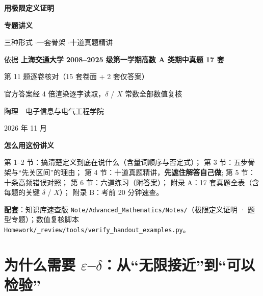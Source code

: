 \documentclass[11pt,a4paper]{ctexart}
\newcommand{\eps}{\varepsilon}
\newcounter{exa}[section]
\begin{document}
\begin{titlepage}
\centering
\vspace*{2.0cm}
{\Huge\bfseries 用极限定义证明\par}
\vspace{0.45cm}
{\Huge\bfseries 专题讲义\par}
\vspace{0.9cm}
{\large 三种形式 \quad$\cdot$\quad 一套骨架 \quad$\cdot$\quad 十道真题精讲\par}
\vspace{1.4cm}
{\large 依据 \textbf{上海交通大学 2008--2025 级第一学期高数 A 类期中真题 17 套}\par}
\vspace{0.3cm}
{\large 第 11 题逐卷核对（15 套卷面 + 2 套仅答案）\par}
\vspace{0.3cm}
{\large 官方答案经 4 倍渲染逐字读取，$\delta$ / $X$ 常数全部数值复核\par}
\vspace{2.0cm}
{\large 陶理\ \ 电子信息与电气工程学院\par}
\vspace{0.3cm}
{\large 2026 年 11 月\par}
\vfill
{\small\begin{minipage}{0.86\textwidth}
\textbf{怎么用这份讲义}\par\vspace{2pt}
第 1--2 节：搞清楚定义到底在说什么（含量词顺序与否定式）；\quad
第 3 节：五步骨架与“先关区间”的理由；\quad
第 4 节：十道真题精讲，\textbf{先遮住解答自己做}; \quad
第 5 节：十条高频错误对照；\quad
第 6 节：六道练习（附答案）；\quad
附录 A：17 套真题全表（含每题的关键 $\delta$ / $X$）；\quad
附录 B：考前 20 分钟速查。\par\vspace{3pt}
\textbf{配套}：知识库速查版 \texttt{Note/Advanced\_Mathematics/Notes/}（极限定义证明 · 题型专题）；数值复核脚本 \texttt{Homework/\_review/tools/verify\_handout\_examples.py}。
\end{minipage}}
\end{titlepage}

\tableofcontents
\newpage

\section{为什么需要 $\eps$--$\delta$：从“无限接近”到“可以检验”}
\end{document}
